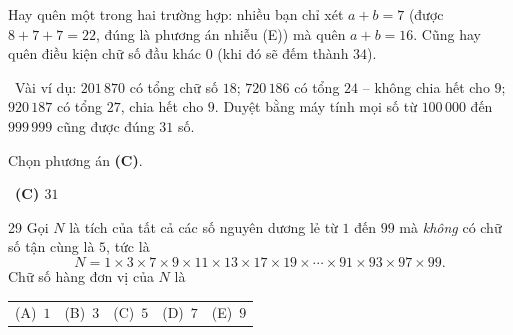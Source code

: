 \documentclass[11pt]{article}
\makeatletter
\providecommand{\AnsWord}{Đáp số}
\newenvironment{probbox}[2]{\begin{probboxT}{#1}{#2}}{\end{probboxT}}
\newcommand{\ans}[1]{\par\smallskip{\bfseries\color{tmGreen!88!black}\AnsWord:}\ {\bfseries\color{AnsRed}#1}\par}
\newcommand{\verify}[1]{\par\smallskip\noindent{\bfseries\color{tmGreen!80!black}\faCheckCircle\ \CheckWord}\ #1\par}
\newcommand{\choices}[5]{\par\smallskip\noindent
  \begin{tabularx}{\linewidth}{@{}XXXXX@{}}(A)\ #1&(B)\ #2&(C)\ #3&(D)\ #4&(E)\ #5\end{tabularx}\par}
\def\AnsWord{Đáp số}
\def\CheckWord{Thử lại:}
\makeatother
\begin{document}
{\begin{warnbox}Hay quên một trong hai trường hợp: nhiều bạn chỉ xét $a+b=7$ (được $8+7+7=22$, đúng là phương án nhiễu (E)) mà quên $a+b=16$. Cũng hay quên điều kiện chữ số đầu khác $0$ (khi đó sẽ đếm thành $34$).\end{warnbox}

\verify{Vài ví dụ: $201\,870$ có tổng chữ số $18$; $720\,186$ có tổng $24$ -- không chia hết cho $9$; $920\,187$ có tổng $27$, chia hết cho $9$. Duyệt bằng máy tính mọi số từ $100\,000$ đến $999\,999$ cũng được đúng $31$ số.}
Chọn phương án \textbf{(C)}.
\ans{(C) $31$}
}

\begin{probbox}{29}{\relax}
Gọi $N$ là tích của tất cả các số nguyên dương lẻ từ $1$ đến $99$ mà \emph{không} có chữ số tận cùng là $5$, tức là
\[N=1\times 3\times 7\times 9\times 11\times 13\times 17\times 19\times\cdots\times 91\times 93\times 97\times 99.\]
Chữ số hàng đơn vị của $N$ là
\choices{$1$}{$3$}{$5$}{$7$}{$9$}
\end{probbox}
\end{document}
